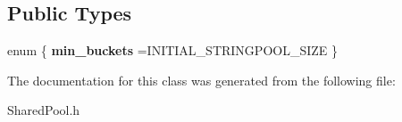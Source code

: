 \subsection*{Public Types}
\begin{DoxyCompactItemize}
\item 
enum \{ {\bfseries min\+\_\+buckets} =I\+N\+I\+T\+I\+A\+L\+\_\+\+S\+T\+R\+I\+N\+G\+P\+O\+O\+L\+\_\+\+S\+I\+ZE
 \}\hypertarget{classStringpoolTraits_ae838f0c1e3d811093e6c6eaa68e1b4dd}{}\label{classStringpoolTraits_ae838f0c1e3d811093e6c6eaa68e1b4dd}

\end{DoxyCompactItemize}


The documentation for this class was generated from the following file\+:\begin{DoxyCompactItemize}
\item 
Shared\+Pool.\+h\end{DoxyCompactItemize}
